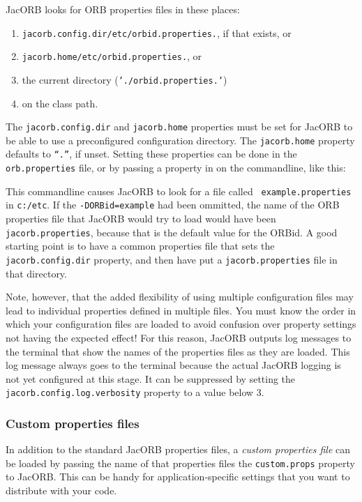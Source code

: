 JacORB looks for ORB properties files in these places:

\begin{enumerate}
\item {\tt jacorb.config.dir/etc/orbid.properties.}, if that exists, or
\item {\tt jacorb.home/etc/orbid.properties.}, or
\item the current directory ({\tt './orbid.properties.'})
\item on the class path.
\end{enumerate}

The {\tt jacorb.config.dir} and {\tt jacorb.home} properties must be
set for JacORB to be able to use a preconfigured configuration
directory. The {\tt jacorb.home} property defaults to {\tt ``.''}, if
unset. Setting these properties can be done in the {\tt
  orb.properties} file, or by passing a property in on the
commandline, like this:


This commandline causes JacORB to look for a file called {\tt
  example.properties} in {\tt c:/etc}. If the {\tt -DORBid=example}
had been ommitted, the name of the ORB properties file that JacORB
would try to load would have been {\tt jacorb.properties}, because
that is the default value for the ORBid. A good starting point is to
have a common properties file that sets the {\tt jacorb.config.dir}
property, and then have put a {\tt jacorb.properties} file in that
directory.

Note, however, that the added flexibility of using multiple
configuration files may lead to individual properties defined in
multiple files. You must know the order in which your configuration
files are loaded to avoid confusion over property settings not having
the expected effect! For this reason, JacORB outputs log messages to
the terminal that show the names of the properties files as they are
loaded. This log message always goes to the terminal because the
actual JacORB logging is not yet configured at this stage. It can be
suppressed by setting the {\tt jacorb.config.log.verbosity} property
to a value below 3.

\subsubsection{Custom properties files}

In addition to the standard JacORB properties files, a {\em custom
  properties file} can be loaded by passing the name of that
properties files the {\tt custom.props} property to JacORB. This can
be handy for application-specific settings that you want to distribute
with your code.

